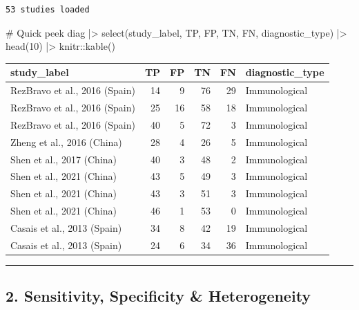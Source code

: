 \documentclass[
  letterpaper,
  DIV=11,
  numbers=noendperiod]{scrartcl}
\newenvironment{Shaded}{\begin{snugshade}}{\end{snugshade}}
\newcommand{\CommentTok}[1]{\textcolor[rgb]{0.37,0.37,0.37}{#1}}
\newcommand{\DecValTok}[1]{\textcolor[rgb]{0.68,0.00,0.00}{#1}}
\newcommand{\FunctionTok}[1]{\textcolor[rgb]{0.28,0.35,0.67}{#1}}
\newcommand{\NormalTok}[1]{\textcolor[rgb]{0.00,0.23,0.31}{#1}}
\newcommand{\SpecialCharTok}[1]{\textcolor[rgb]{0.37,0.37,0.37}{#1}}
\newcounter{none} %
\begin{document}
\begin{verbatim}
53 studies loaded
\end{verbatim}

\begin{Shaded}
\begin{Highlighting}[]
\CommentTok{\# Quick peek}
\NormalTok{diag }\SpecialCharTok{|\textgreater{}}
  \FunctionTok{select}\NormalTok{(study\_label, TP, FP, TN, FN, diagnostic\_type) }\SpecialCharTok{|\textgreater{}}
  \FunctionTok{head}\NormalTok{(}\DecValTok{10}\NormalTok{) }\SpecialCharTok{|\textgreater{}}
\NormalTok{  knitr}\SpecialCharTok{::}\FunctionTok{kable}\NormalTok{()}
\end{Highlighting}
\end{Shaded}

{\def\LTcaptype{none} %
\begin{longtable}[]{@{}lrrrrl@{}}
\toprule\noalign{}
study\_label & TP & FP & TN & FN & diagnostic\_type \\
\midrule\noalign{}
\endhead
\bottomrule\noalign{}
\endlastfoot
RezBravo et al., 2016 (Spain) & 14 & 9 & 76 & 29 & Immunological \\
RezBravo et al., 2016 (Spain) & 25 & 16 & 58 & 18 & Immunological \\
RezBravo et al., 2016 (Spain) & 40 & 5 & 72 & 3 & Immunological \\
Zheng et al., 2016 (China) & 28 & 4 & 26 & 5 & Immunological \\
Shen et al., 2017 (China) & 40 & 3 & 48 & 2 & Immunological \\
Shen et al., 2021 (China) & 43 & 5 & 49 & 3 & Immunological \\
Shen et al., 2021 (China) & 43 & 3 & 51 & 3 & Immunological \\
Shen et al., 2021 (China) & 46 & 1 & 53 & 0 & Immunological \\
Casais et al., 2013 (Spain) & 34 & 8 & 42 & 19 & Immunological \\
Casais et al., 2013 (Spain) & 24 & 6 & 34 & 36 & Immunological \\
\end{longtable}
}

\begin{center}\rule{0.5\linewidth}{0.5pt}\end{center}

\subsection{2. Sensitivity, Specificity \&
Heterogeneity}\label{sensitivity-specificity-heterogeneity}
\end{document}
